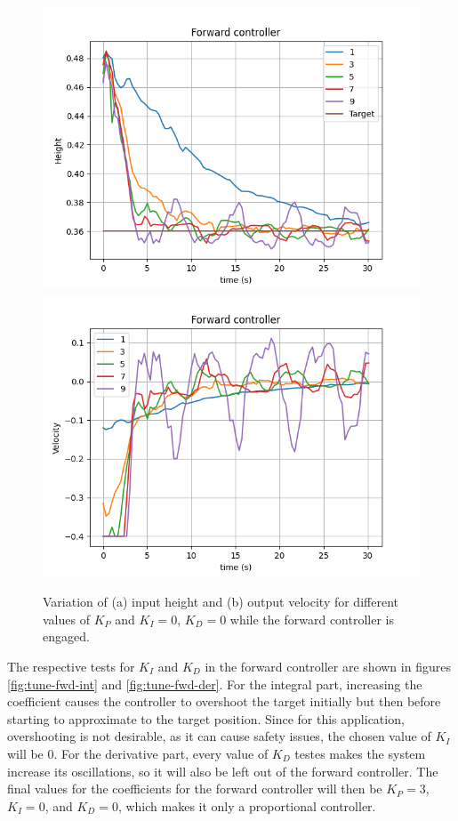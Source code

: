 \begin{figure}
  \centering
  \includegraphics[width=.45\linewidth]{img/pid/fwd/aaa_fwd_pos_prop_i0_d0.png}
  \includegraphics[width=.45\linewidth]{img/pid/fwd/aaa_fwd_vel_prop_i0_d0.png}
  \caption{Variation of (a) input height and (b) output velocity for different values of $K_{P}$ and $K_I=0$, $K_D=0$ while the forward controller is engaged.}\label{fig:tune-fwd-prop}
\end{figure}


The respective tests for $K_I$ and $K_D$ in the forward controller are shown in figures \ref{fig:tune-fwd-int} and \ref{fig:tune-fwd-der}.
For the integral part, increasing the coefficient causes the controller to overshoot the target initially but then before starting to approximate to the target position.
Since for this application, overshooting is not desirable, as it can cause safety issues, the chosen value of $K_I$ will be 0.
For the derivative part, every value of $K_D$ testes makes the system increase its oscillations, so it will also be left out of the forward controller.
The final values for the coefficients for the forward controller will then be $K_P=3$, $K_I=0$, and $K_D=0$, which makes it only a proportional controller.


